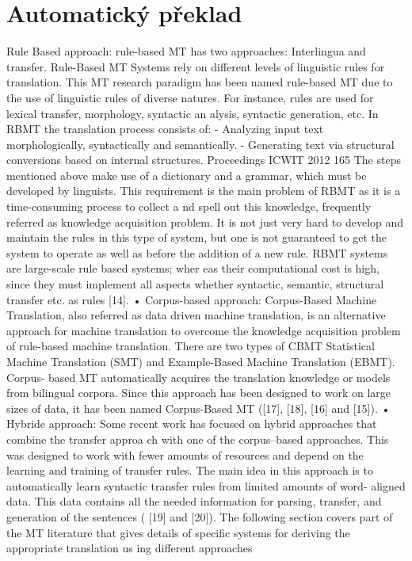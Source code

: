\documentclass{bakalarka}[12pt]
\begin{document}
\chapter{Automatický překlad}


Rule Based approach:
 rule-based MT has two approaches: Interlingua and 
transfer. Rule-Based MT Systems rely on different levels of linguistic rules for 
translation. This MT research paradigm has been named rule-based MT due to 
the use of linguistic rules of diverse natures. For instance, rules are used for 
lexical transfer, morphology, syntactic an
alysis, syntactic generation, etc. In 
RBMT the translation process consists of: 
-
 Analyzing input text morphologically, syntactically and semantically. 
-
 Generating text via structural conversions based on internal structures. 
Proceedings ICWIT 2012                                                                                      165 
The steps mentioned above make use of a dictionary and a grammar, which must 
be developed by linguists. This requirement is the main problem of RBMT as it 
is a time-consuming process to collect a
nd spell out this knowledge, frequently 
referred as knowledge acquisition problem. It is not just very hard to develop 
and maintain the rules in this type of system, but one is not guaranteed to get the 
system to operate as well as before the addition of a new rule. RBMT systems 
are large-scale rule based systems; wher
eas their computational cost is high, 
since they must implement all aspects 
whether syntactic, semantic, structural 
transfer etc. as rules [14]. 
•
Corpus-based approach: 
Corpus-Based Machine Translation, also referred as 
data driven machine translation, is an alternative approach for machine 
translation to overcome the knowledge acquisition problem of rule-based 
machine translation. There are two 
types of CBMT Statistical Machine 
Translation (SMT) and Example-Based Machine Translation (EBMT). Corpus-
based MT automatically acquires the translation knowledge or models from 
bilingual corpora. Since this approach has been designed to work on large sizes 
of data, it has been named Corpus-Based MT ([17], [18], [16] and [15]). 
•
Hybride approach:
 Some recent work has focused 
on hybrid approaches that 
combine the transfer approa
ch with one of 
the corpus–based 
approaches. This 
was designed to work with fewer amounts of resources and depend on the 
learning and training of transfer rules.
 The main idea in this approach is to 
automatically learn syntactic transfer rules from limited amounts of word-
aligned data. This data contains all the needed information for parsing, transfer, 
and generation of the sentences ( [19] and [20]). The following section covers 
part of the MT literature that gives details of specific systems for deriving the 
appropriate translation us
ing different approaches
\end{document}
